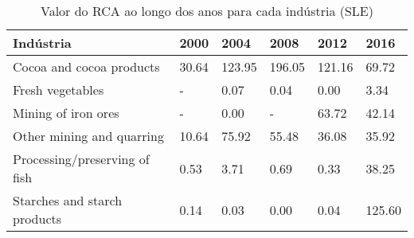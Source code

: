 \begin{table}
\centering
\caption{Valor do RCA ao longo dos anos para cada indústria (SLE)}
\label{tab:ex3-tempo-SLE}
\begin{tabular}{p{6cm}p{1.5cm}p{1.5cm}p{1.5cm}p{1.5cm}p{1.5cm}}
\toprule
                    Indústria &  2000 &   2004 &   2008 &   2012 &   2016 \\
\midrule
     Cocoa and cocoa products & 30.64 & 123.95 & 196.05 & 121.16 &  69.72 \\
             Fresh vegetables &     - &   0.07 &   0.04 &   0.00 &   3.34 \\
          Mining of iron ores &     - &   0.00 &      - &  63.72 &  42.14 \\
    Other mining and quarring & 10.64 &  75.92 &  55.48 &  36.08 &  35.92 \\
Processing/preserving of fish &  0.53 &   3.71 &   0.69 &   0.33 &  38.25 \\
 Starches and starch products &  0.14 &   0.03 &   0.00 &   0.04 & 125.60 \\
\bottomrule
\end{tabular}
\end{table}
